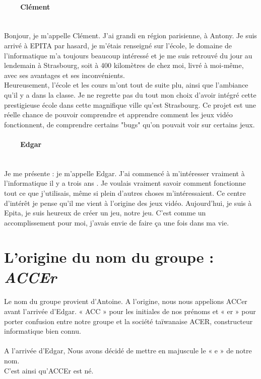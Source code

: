 \documentclass[titlepage, 13px, a4paper]{report}
\begin{document}
\paragraph{~~~~Clément} \hspace{0pt} \\
Bonjour, je m'appelle Clément. J’ai grandi en région parisienne, à Antony. 
Je suis arrivé à EPITA par hasard, je m'étais renseigné sur l'école, le domaine de 
l'informatique m'a toujours beaucoup intéressé et je me suis retrouvé du jour au 
lendemain à Strasbourg, soit à 400 kilomètres de chez moi, livré à moi-même, avec 
ses avantages et ses inconvénients. \\
Heureusement, l'école et les cours m'ont tout de suite plu, ainsi que l'ambiance 
qu'il y a dans la classe. Je ne regrette pas du tout mon choix d'avoir intégré cette 
prestigieuse école dans cette magnifique ville qu'est Strasbourg. Ce projet est une 
réelle chance de pouvoir comprendre et apprendre comment les jeux vidéo fonctionnent, 
de comprendre certains "bugs" qu'on pouvait voir sur certains jeux.  \\

\newpage

\paragraph{~~~~Edgar} \hspace{0pt} \\
Je me présente : je m’appelle Edgar. J’ai commencé à m’intéresser vraiment à l’informatique  il y a trois ans . Je voulais 
vraiment savoir comment fonctionne tout ce que j’utilisais, même si plein d’autres choses m’intéressaient. Ce centre d’intérêt 
je pense qu’il me vient à l’origine des jeux vidéo. Aujourd’hui, je suis à Epita, je suis heureux de créer un jeu, notre jeu. 
C’est comme un accomplissement pour moi, j’avais envie de faire ça une fois dans ma vie. \\


\section{L'origine du nom du groupe : \textit{ACCEr}}
\paragraph*{} \hspace{0pt}
Le nom du groupe provient d’Antoine. A l’origine, nous nous appelions ACCer avant l’arrivée d’Edgar. 
« ACC » pour les initiales de nos prénoms et « er » pour porter confusion entre notre groupe 
et la société taïwanaise ACER, constructeur informatique bien connu. \\ \\
A l’arrivée d’Edgar, Nous avons décidé de mettre en majuscule le « e » de notre nom. \\
C’est ainsi qu’ACCEr est né.
\end{document}
